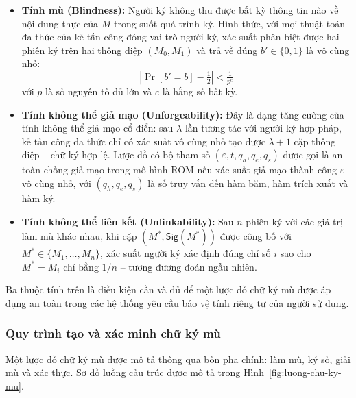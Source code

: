 \begin{itemize}
    \item \textbf{Tính mù (Blindness):} Người ký không thu được bất kỳ thông tin nào về nội dung thực của $M$ trong suốt quá trình ký. Hình thức, với mọi thuật toán đa thức của kẻ tấn công đóng vai trò người ký, xác suất phân biệt được hai phiên ký trên hai thông điệp $(M_0, M_1)$ và trả về đúng $b' \in \{0, 1\}$ là vô cùng nhỏ:
    \begin{equation}
        \left| \Pr[b' = b] - \tfrac{1}{2} \right| < \tfrac{1}{p^c}
        \label{eq:blindness}
    \end{equation}
    với $p$ là số nguyên tố đủ lớn và $c$ là hằng số bất kỳ.

    \item \textbf{Tính không thể giả mạo (Unforgeability):} Đây là dạng tăng cường của tính không thể giả mạo cổ điển: sau $\lambda$ lần tương tác với người ký hợp pháp, kẻ tấn công đa thức chỉ có xác suất vô cùng nhỏ tạo được $\lambda + 1$ cặp thông điệp -- chữ ký hợp lệ. Lược đồ có bộ tham số $(\varepsilon, t, q_h, q_e, q_s)$ được gọi là an toàn chống giả mạo trong mô hình ROM nếu xác suất giả mạo thành công $\varepsilon$ vô cùng nhỏ, với $(q_h, q_e, q_s)$ là số truy vấn đến hàm băm, hàm trích xuất và hàm ký.

    \item \textbf{Tính không thể liên kết (Unlinkability):} Sau $n$ phiên ký với các giá trị làm mù khác nhau, khi cặp $(M^*, \textsf{Sig}(M^*))$ được công bố với $M^* \in \{M_1, \ldots, M_n\}$, xác suất người ký xác định đúng chỉ số $i$ sao cho $M^* = M_i$ chỉ bằng $1/n$ -- tương đương đoán ngẫu nhiên.
\end{itemize}

Ba thuộc tính trên là điều kiện cần và đủ để một lược đồ chữ ký mù được áp dụng an toàn trong các hệ thống yêu cầu bảo vệ tính riêng tư của người sử dụng.

\subsubsection{Quy trình tạo và xác minh chữ ký mù}

Một lược đồ chữ ký mù được mô tả thông qua bốn pha chính: làm mù, ký số, giải mù và xác thực. Sơ đồ luồng cấu trúc được mô tả trong Hình~\ref{fig:luong-chu-ky-mu}.

